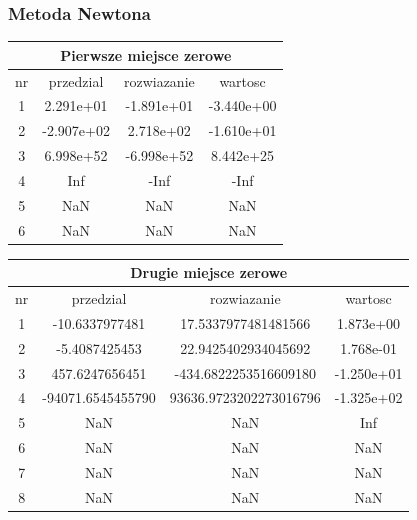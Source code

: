\documentclass[polish, 11pt, oneside]{article}   	%
\begin{document}
\subsubsection{Metoda Newtona}

\begin{center}
\begin{tabular}{ |c|c|c|c| } 
\hline
\multicolumn{4}{|c|}{Pierwsze miejsce zerowe} \\
 \hline
 nr & przedzial & rozwiazanie & wartosc \\
 \hline
  1 &    2.291e+01 &   -1.891e+01 &   -3.440e+00 \\ 
  2 &   -2.907e+02 &    2.718e+02 &   -1.610e+01 \\ 
  3 &    6.998e+52 &   -6.998e+52 &    8.442e+25 \\ 
  4 &          Inf &         -Inf &         -Inf \\ 
  5 &          NaN &          NaN &          NaN \\ 
  6 &          NaN &          NaN &          NaN \\ 
 \hline
\end{tabular}
\end{center}

\begin{center}
\begin{tabular}{ |c|c|c|c| } 
\hline
\multicolumn{4}{|c|}{Drugie miejsce zerowe} \\
 \hline
 nr & przedzial & rozwiazanie & wartosc \\
 \hline
1 & -10.6337977481 & 17.5337977481481566 &    1.873e+00 \\ 
  2 & -5.4087425453 & 22.9425402934045692 &    1.768e-01 \\ 
  3 & 457.6247656451 & -434.6822253516609180 &   -1.250e+01 \\ 
  4 & -94071.6545455790 & 93636.9723202273016796 &   -1.325e+02 \\ 
  5 &          NaN &          NaN &          Inf \\ 
  6 &          NaN &          NaN &          NaN \\ 
  7 &          NaN &          NaN &          NaN \\ 
  8 &          NaN &          NaN &          NaN \\ 
   \hline
\end{tabular}
\end{center}
\end{document}
